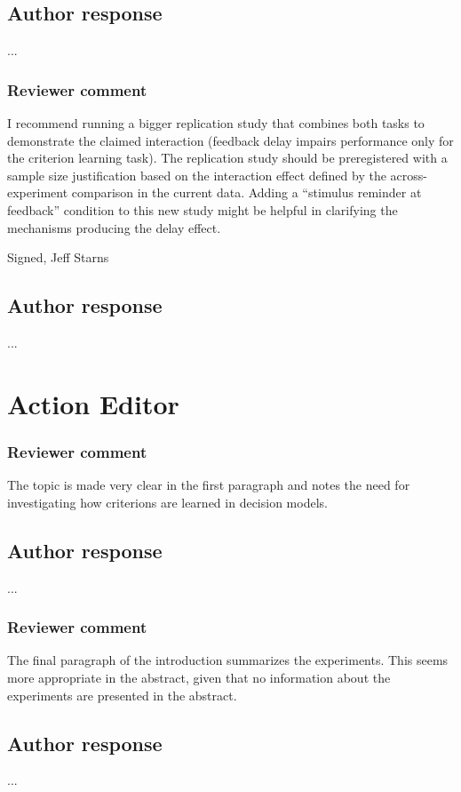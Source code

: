 \documentclass[12pt]{article}
\begin{document}
\subsection{Author response}
...

\subsubsection{Reviewer comment}
I recommend running a bigger replication study that combines
both tasks to demonstrate the claimed interaction (feedback
delay impairs performance only for the criterion learning
task). The replication study should be preregistered with a
sample size justification based on the interaction effect
defined by the across-experiment comparison in the current
data. Adding a “stimulus reminder at feedback” condition to
this new study might be helpful in clarifying the mechanisms
producing the delay effect.

Signed,
Jeff Starns

\subsection{Author response}
...

\section*{Action Editor}

\subsubsection{Reviewer comment}
The topic is made very clear in the first paragraph and
notes the need for investigating how criterions are learned
in decision models.

\subsection{Author response}
...

\subsubsection{Reviewer comment}
The final paragraph of the introduction summarizes the
experiments. This seems more appropriate in the abstract,
given that no information about the experiments are
presented in the abstract.

\subsection{Author response}
...
\end{document}
